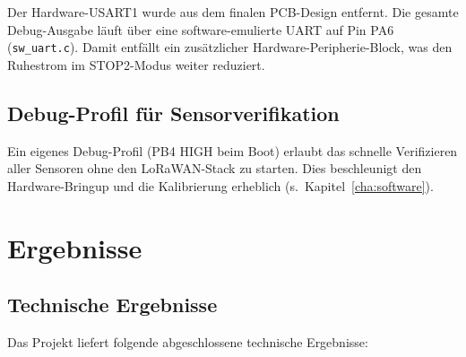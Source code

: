 Der Hardware-USART1 wurde aus dem finalen PCB-Design entfernt. Die gesamte Debug-Ausgabe läuft über eine software-emulierte UART auf Pin PA6 (\texttt{sw\_uart.c}). Damit entfällt ein zusätzlicher Hardware-Peripherie-Block, was den Ruhestrom im STOP2-Modus weiter reduziert.

\subsection*{Debug-Profil für Sensorverifikation}

Ein eigenes Debug-Profil (PB4 HIGH beim Boot) erlaubt das schnelle Verifizieren aller Sensoren ohne den LoRaWAN-Stack zu starten. Dies beschleunigt den Hardware-Bringup und die Kalibrierung erheblich (s.\ Kapitel~\ref{cha:software}).

\section*{Ergebnisse}

\subsection*{Technische Ergebnisse}

Das Projekt liefert folgende abgeschlossene technische Ergebnisse:

